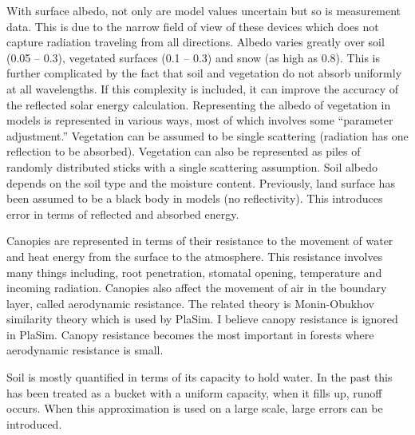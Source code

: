 \documentclass[11pt,oneside]{article}
\begin{document}
With surface albedo, not only are model values uncertain but so is measurement data.  This is due to the narrow field of view of these devices which does not capture radiation traveling from all directions.  Albedo varies greatly over soil (0.05 -- 0.3), vegetated surfaces (0.1 -- 0.3) and snow (as high as 0.8). This is further complicated by the fact that soil and vegetation do not absorb uniformly at all wavelengths.  If this complexity is included, it can improve the accuracy of the reflected solar energy calculation.  Representing the albedo of vegetation in models is represented in various ways, most of which involves some ``parameter adjustment.''  Vegetation can be assumed to be single scattering (radiation has one reflection to be absorbed). Vegetation can also be represented as piles of randomly distributed sticks with a single scattering assumption.   Soil albedo depends on the soil type and the moisture content. Previously, land surface has been assumed to be a black body in models (no reflectivity).  This introduces error in terms of reflected and absorbed energy. 

Canopies are represented in terms of their resistance to the movement of water and heat energy from the surface to the atmosphere.  This resistance involves many things including, root penetration, stomatal opening, temperature and incoming radiation.  Canopies also affect the movement of air in the boundary layer, called aerodynamic resistance.  The related theory is Monin-Obukhov similarity theory which is used by PlaSim.  I believe canopy resistance is ignored in PlaSim.  Canopy resistance becomes the most important in forests where aerodynamic resistance is small. 
 
Soil is mostly quantified in terms of its capacity to hold water. In the past this has been treated as a bucket with a uniform capacity, when it fills up, runoff occurs.  When this approximation is used on a large scale, large errors can be introduced. 
\end{document}

